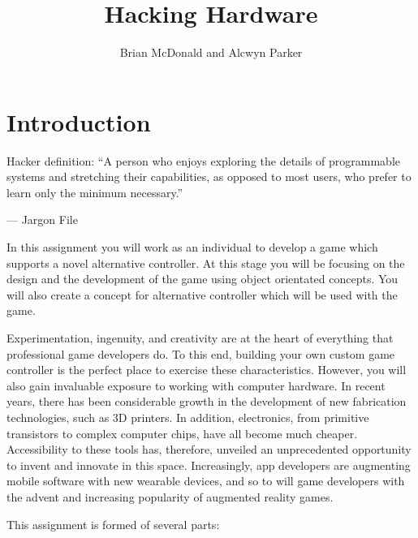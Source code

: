 \documentclass{../../fal_assignment}
\title{Hacking Hardware}
\author{Brian McDonald and Alcwyn Parker}
\begin{document}
	
	\maketitle
	
	\section*{Introduction}
	
	\begin{marginquote}
		Hacker definition: ``A person who enjoys exploring the details of programmable systems and stretching their capabilities, as opposed to most users, who prefer to learn only the minimum necessary.''
		
		--- Jargon File
		
	\end{marginquote}
	
	In this assignment you will work as an individual to develop a game which supports a novel alternative controller. At this stage you will be focusing on the design and the development of the game using object orientated concepts. You will also create a concept for alternative controller which will be used with the game.
	
	Experimentation, ingenuity, and creativity are at the heart of everything that professional game developers do. To this end, building your own custom game controller is the perfect place to exercise these characteristics. However, you will also gain invaluable exposure to working with computer hardware. In recent years, there has been considerable growth in the development of new fabrication technologies, such as 3D printers. In addition, electronics, from primitive transistors to complex computer chips, have all become much cheaper. Accessibility to these tools has, therefore, unveiled an unprecedented opportunity to invent and innovate in this space. Increasingly, app developers are augmenting mobile software with new wearable devices, and so to will game developers with the advent and increasing popularity of augmented reality games.
	
	This assignment is formed of several parts:
	
\end{document}
